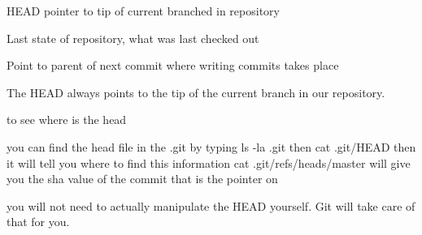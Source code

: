 HEAD 
  pointer to tip of current branched in repository 

  Last state of repository, what was last checked out 

  Point to parent of next commit where writing commits takes place 

  The HEAD always points to the tip of the current branch in our repository.

to see where is the head 

you can find the head file in the .git by typing 
ls -la .git 
then 
cat .git/HEAD
then it will tell you where to find this information
cat .git/refs/heads/master 
will give you the sha value of the commit that is the pointer on 

you will not need to actually manipulate the HEAD yourself. Git will take care of that for you. 
